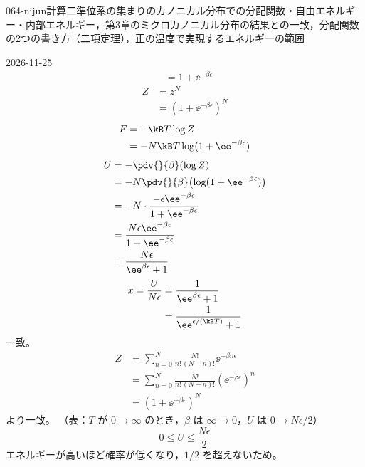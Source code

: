 \documentclass[uplatex,dvipdfmx,a4paper,11pt]{jsarticle}
\begin{document}
\begin{mondai}{064-nijun}{計算}{二準位系の集まりのカノニカル分布での分配関数・自由エネルギー・内部エネルギー，第3章のミクロカノニカル分布の結果との一致，分配関数の2つの書き方（二項定理），正の温度で実現するエネルギーの範囲}
\begin{kotaeutsushi}{2026-11-25}
\begin{align*}
&=1+\ee^{-\beta\epsilon}
\end{align*}
\begin{align*}
Z&=z^{N}\\
&=(1+\ee^{-\beta\epsilon})^{N}
\end{align*}
\begin{align*}
F&=-\kB T\log Z\\
&=-N\kB T\log(1+\ee^{-\beta\epsilon})
\end{align*}
\begin{align*}
U&=-\pdv{}{\beta}(\log Z)\\
&=-N\pdv{}{\beta}\bigl(\log(1+\ee^{-\beta\epsilon})\bigr)\\
&=-N\cdot\frac{-\epsilon\ee^{-\beta\epsilon}}{1+\ee^{-\beta\epsilon}}\\
&=\frac{N\epsilon\ee^{-\beta\epsilon}}{1+\ee^{-\beta\epsilon}}\\
&=\frac{N\epsilon}{\ee^{\beta\epsilon}+1}
\end{align*}
\begin{align*}
x=\frac{U}{N\epsilon}&=\frac{1}{\ee^{\beta\epsilon}+1}\\
&=\frac{1}{\ee^{\epsilon/(\kB T)}+1}
\end{align*}
一致。
\begin{align*}
Z&=\sum_{n=0}^{N}\frac{N!}{n!\,(N-n)!}\ee^{-\beta n\epsilon}\\
&=\sum_{n=0}^{N}\frac{N!}{n!\,(N-n)!}(\ee^{-\beta\epsilon})^{n}\\
&=(1+\ee^{-\beta\epsilon})^{N}
\end{align*}
より一致。
（表：$T$ が $0\to\infty$ のとき，$\beta$ は $\infty\to0$，$U$ は $0\to N\epsilon/2$）
\[ 0\le U\le\frac{N\epsilon}{2} \]
エネルギーが高いほど確率が低くなり，$1/2$ を超えないため。
\end{kotaeutsushi}
\end{mondai}

\noteowari
\end{document}
